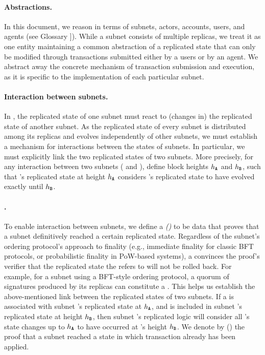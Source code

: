 \paragraph{Abstractions.}
In this document, we reason in terms of subnets, actors, accounts, users, and \ipc agents (see Glossary \cite{glossary}]).
While a subnet consists of multiple replicas, we treat it as one entity maintaining a common abstraction of a replicated state
that can only be modified through transactions submitted either by a users or by an \ipc agent.
We abstract away the concrete mechanism of transaction submission and execution, as it is specific to the implementation of each particular subnet.

\paragraph{Interaction between subnets.}
In \ipc, the replicated state of one subnet must react to (changes in) the replicated state of another subnet.
As the replicated state of every subnet is distributed among its replicas and evolves independently of other subnets,
we must establish a mechanism for interactions between the states of subnets.
In particular, we must explicitly link the two replicated states of two subnets.
More precisely, for any interaction between two subnets ( and ), define block heights $h_{\textbf{\texttt{A}}}$ and $h_{\textbf{\texttt{B}}}$,
such that 's replicated state at height $h_{\textbf{\texttt{A}}}$ considers 's replicated state to have evolved exactly until $h_{\textbf{\texttt{B}}}$.

\paragraph{\pofsFull.}
To enable interaction between subnets, we define a \emph{\pofFull (\pof)} to be data that proves that a subnet definitively reached a certain replicated state.
Regardless of the subnet's ordering protocol's approach to finality (e.g., immediate finality for classic BFT protocols, or probabilistic finality in PoW-based systems),
a \pof convinces the proof's verifier that the replicated state the \pof refers to will not be rolled back.
For example, for a subnet using a BFT-style ordering protocol, a quorum of signatures produced by its replicas can constitute a \pof.
This helps us establish the above-mentioned link between the replicated states of two subnets.
If a \pof is associated with subnet 's replicated state at $h_{\textbf{\texttt{A}}}$,
and \pof is included in subnet 's replicated state at height $h_{\textbf{\texttt{B}}}$,
then subnet 's replicated logic will consider all 's state changes up to $h_{\textbf{\texttt{A}}}$
to have occurred at 's height $h_{\textbf{\texttt{B}}}$.
We denote by {\pof}() the proof that a subnet reached a state in which transaction  already has been applied.

